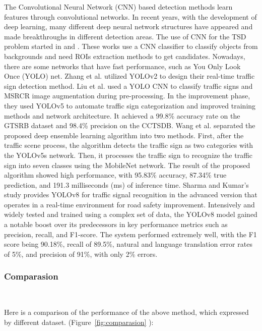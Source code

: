\documentclass[letterpaper, 10 pt, conference]{ieeeconf}
\begin{document}
The Convolutional Neural Network (CNN) based detection methods learn features through convolutional networks. In recent years, with the development of deep learning, many different deep neural network structures have appeared and made breakthroughs in different detection areas. The use of CNN for the TSD problem started in \cite{Wu2013} and \cite{Qian2015}. These works use a CNN classifier to classify objects from backgrounds and need ROIs extraction methods to get candidates. Nowadays, there are some networks that have fast performance, such as You Only Look Once (YOLO) net. Zhang et al. \cite{Zhang2017} utilized YOLOv2 to design their real-time traffic sign detection method. Liu et al. \cite{Liu2024} used a YOLO CNN to classify traffic signs and MSRCR image augmentation during pre-processing. In the improvement phase, they used YOLOv5 to automate traffic sign categorization and improved training methods and network architecture. It achieved a 99.8\% accuracy rate on the GTSRB dataset and 98.4\% precision on the CCTSDB. Wang et al. \cite{Wang2024} separated the proposed deep ensemble learning algorithm into two methods. First, after the traffic scene process, the algorithm detects the traffic sign as two categories with the YOLOv5s network. Then, it processes the traffic sign to recognize the traffic sign into seven classes using the MobileNet network. The result of the proposed algorithm showed high performance, with 95.83\% accuracy, 87.34\% true prediction, and 191.3 milliseconds (ms) of inference time. Sharma and Kumar’s study \cite{Sharma2024} provides YOLOv8 for traffic signal recognition in the advanced version that operates in a real-time environment for road safety improvement. Intensively and widely tested and trained using a complex set of data, the YOLOv8 model gained a notable boost over its predecessors in key performance metrics such as precision, recall, and F1-score. The system performed extremely well, with the F1 score being 90.18\%, recall of 89.5\%, natural and language translation error rates of 5\%, and precision of 91\%, with only 2\% errors.

\subsubsection{Comparasion}\

Here is a comparison of the performance  of the above method, which expressed by different dataset. (Figure~\ref{fig:comparasion} \cite{Liu2019}):
\end{document}
